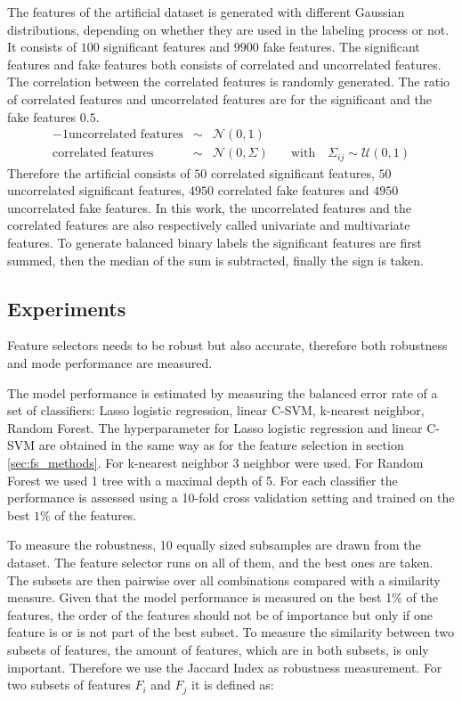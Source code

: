 \documentclass[twoside,11pt]{article}
\begin{document}
The features of the artificial dataset is generated with different Gaussian distributions, depending on whether they are used in the labeling process or not. It consists of $100$ significant features and $9900$ fake features. The significant features and fake features both consists of correlated and uncorrelated features. The correlation between the correlated features is randomly generated. The ratio of correlated features and uncorrelated features are for the significant and the fake features $0.5$. 
\begin{alignat}{-1}
\text{uncorrelated features} & \sim & \mathcal{N}(0, 1) & \\ 
\text{correlated features} & \sim & \mathcal{N}(0, \Sigma) & \quad \text{with} \quad \Sigma_{ij} \sim \mathcal{U}(0,1)
\end{alignat}
Therefore the artificial consists of $50$ correlated significant features, $50$ uncorrelated significant features, $4950$ correlated fake features and $4950$ uncorrelated fake features. In this work, the uncorrelated features and the correlated features are also respectively called univariate and  multivariate features.
To generate balanced binary labels the significant features are first summed, then the median of the sum is subtracted, finally the sign is taken. 

\subsection{Experiments}
\label{sec:experiments}

Feature selectors needs to be robust but also accurate, therefore both robustness and mode performance are measured.

The model performance is estimated by measuring the balanced error rate of a set of classifiers: Lasso logistic regression, linear C-SVM, k-nearest neighbor, Random Forest. The hyperparameter for Lasso logistic regression and linear C-SVM are obtained in the same way as for the feature selection in section \ref{sec:fs_methods}. For k-nearest neighbor 3 neighbor were used. For Random Forest we used 1 tree with a maximal depth of 5.
For each classifier the performance is assessed using a 10-fold cross validation setting and trained on the best $1\%$ of the features.

To measure the robustness, 10 equally sized subsamples are drawn from the dataset. The feature selector runs on all of them, and the best ones are taken. The subsets are then pairwise over all combinations compared with a similarity measure. Given that the model performance is measured on the best 1\% of the features, the order of the features should not be of importance but only if one feature is or is not part of the best subset. To measure the similarity between two subsets of features, the amount of features, which are in both subsets, is only important. Therefore we use the Jaccard Index as robustness measurement. For two subsets of features $F_i$ and $F_j$ it is defined as:
\end{document}
